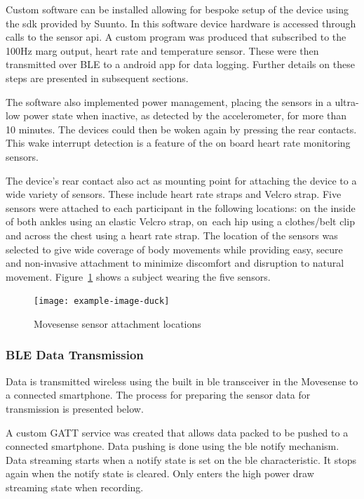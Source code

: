 Custom software can be installed allowing for bespoke setup of the device using the \acrfull{sdk} provided by Suunto. In this software device hardware is accessed through calls to the sensor \acrfull{api}. A custom program was produced that subscribed to the 100Hz \acrshort{marg} output, heart rate and temperature sensor. These were then transmitted over BLE to a android app for data logging. Further details on these steps are presented in subsequent sections.

The software also implemented power management, placing the sensors in a ultra-low power state when inactive, as detected by the accelerometer, for more than 10 minutes. The devices could then be woken again by pressing the rear contacts. This wake interrupt detection is a feature of the on board heart rate monitoring sensors.

The device's rear contact also act as mounting point for attaching the device to a wide variety of sensors. These include heart rate straps and Velcro strap. Five sensors were attached to each participant in the following locations: on the inside of both ankles using an elastic Velcro strap, on~each hip using a clothes/belt clip and across the chest using a heart rate strap. The location of the sensors was selected to give wide coverage of body movements while providing easy, secure and non-invasive attachment to minimize discomfort and disruption to natural movement. Figure~\ref{fig:methods-movesense-sensor-locations} shows a subject wearing the five sensors.

\begin{figure}[!hbt]
    \centering
    \texttt{[image: example-image-duck]}
    \caption{Movesense sensor attachment locations}
    \label{fig:methods-movesense-sensor-locations}
\end{figure}

\subsubsection{BLE Data Transmission}
\label{subsection:methods-on-sensor-compression}
Data is transmitted wireless using the built in \acrfull{ble} transceiver in the Movesense to a connected smartphone. The process for preparing the sensor data for transmission is presented below.

A custom GATT service was created that allows data packed to be pushed to a connected smartphone. Data pushing is done using the \acrshort{ble} notify mechanism. Data streaming starts when a notify state is set on the \acrshort{ble} characteristic. It stops again when the notify state is cleared. Only enters the high power draw streaming state when recording.

